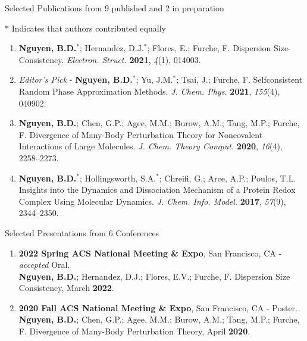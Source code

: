 \documentclass{resume} %
\begin{document}
\begin{rSection}{Selected Publications from 9 published and
    2 in preparation}

  $*$ Indicates that authors contributed equally
  
\begin{enumerate}
\item \textbf{Nguyen, B.D.}$^*$; Hernandez, D.J.$^*$;
  Flores, E.; Furche, F. Dispersion Size-Consistency. \textit{Electron. Struct.}
  \textbf{2021}, \textit{4}(1), 014003.

\item {\em Editor's Pick} - \textbf{Nguyen, B.D.}$^*$; Yu, J.M.$^*$; Tsai, J.;
  Furche, F. Selfconsistent Random Phase Approximation Methods.
  \textit{J. Chem. Phys.} \textbf{2021}, \textit{155}(4), 040902.
      
\item \textbf{Nguyen, B.D.}; Chen, G.P.; Agee, M.M.; Burow, A.M.; Tang, M.P.;
  Furche, F. Divergence of Many-Body Perturbation Theory for Noncovalent Interactions
  of Large Molecules. \textit{J. Chem. Theory Comput.} \textbf{2020}, \textit{16}(4),
  2258--2273.

\item \textbf{Nguyen, B.D.}$^*$; Hollingsworth, S.A.$^*$; Chreifi, G.;
  Arce, A.P.; Poulos, T.L. Insights into the Dynamics and Dissociation Mechanism
  of a Protein Redox Complex Using Molecular Dynamics. \textit{J. Chem. Info. Model.}
  \textbf{2017}, \textit{57}(9), 2344--2350.
  
\end{enumerate}

\end{rSection}

\begin{rSection}{Selected Presentations from 6 Conferences}

  \begin{enumerate}

  \item \textbf{2022 Spring ACS National Meeting \& Expo}, San Francisco, CA - \textit{accepted} Oral. \\
  \textbf{Nguyen, B.D.}; Hernandez, D.J.; Flores, E.V.; Furche, F.
  Dispersion Size Consistency, March \textbf{2022}.
    
  \item \textbf{2020 Fall ACS National Meeting \& Expo}, San Francisco, CA - Poster. \\
  \textbf{Nguyen, B.D.}; Chen, G.P.; Agee, M.M.; Burow, A.M.; Tang, M.P.;
  Furche, F. Divergence of Many-Body Perturbation Theory, April \textbf{2020}.

  \end{enumerate}
  
\end{rSection}
\end{document}

